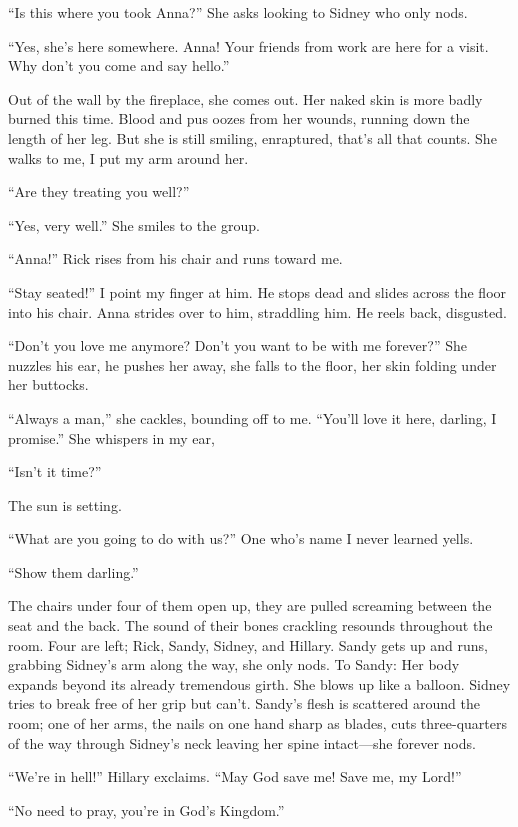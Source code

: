 ``Is this where you took Anna?'' She asks looking to Sidney who only
nods.

``Yes, she's here somewhere. Anna! Your friends from work are here for a
visit. Why don't you come and say hello.''

Out of the wall by the fireplace, she comes out. Her naked skin is more
badly burned this time. Blood and pus oozes from her wounds, running
down the length of her leg. But she is still smiling, enraptured, that's
all that counts. She walks to me, I put my arm around her.

``Are they treating you well?''

``Yes, very well.'' She smiles to the group.

``Anna!'' Rick rises from his chair and runs toward me.

``Stay seated!'' I point my finger at him. He stops dead and slides
across the floor into his chair. Anna strides over to him, straddling
him. He reels back, disgusted.

``Don't you love me anymore? Don't you want to be with me forever?'' She
nuzzles his ear, he pushes her away, she falls to the floor, her skin
folding under her buttocks.

``Always a man,'' she cackles, bounding off to me. ``You'll love it
here, darling, I promise.'' She whispers in my ear,

``Isn't it time?''

The sun is setting.

``What are you going to do with us?'' One who's name I never learned
yells.

``Show them darling.''

The chairs under four of them open up, they are pulled screaming between
the seat and the back. The sound of their bones crackling resounds
throughout the room. Four are left; Rick, Sandy, Sidney, and Hillary.
Sandy gets up and runs, grabbing Sidney's arm along the way, she only
nods. To Sandy: Her body expands beyond its already tremendous girth.
She blows up like a balloon. Sidney tries to break free of her grip but
can't. Sandy's flesh is scattered around the room; one of her arms, the
nails on one hand sharp as blades, cuts three-quarters of the way
through Sidney's neck leaving her spine intact---she forever nods.

``We're in hell!'' Hillary exclaims. ``May God save me! Save me, my
Lord!''

``No need to pray, you're in God's Kingdom.''

